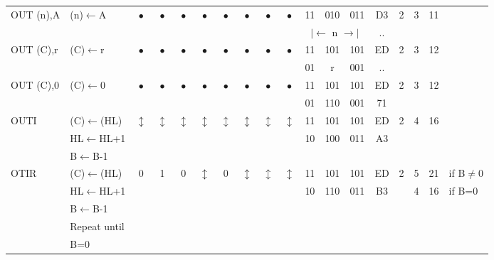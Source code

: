 \documentclass[oneside,a4paper]{book}
\newcommand{\instrt}{\rule{0pt}{2.7ex}}
\newcommand{\instrb}{\rule[-1.7ex]{0pt}{0pt}}
\begin{document}
{\begin{tabular}{llcccccccccccccccl}
		OUT (n),A\instrt & 
			(n)$\leftarrow$A &
			$\bullet$ & 
				$\bullet$ & 
				$\bullet$ & 
				$\bullet$ & 
				$\bullet$ & 
				$\bullet$ & 
				$\bullet$ & 
				$\bullet$ & 
			11 & 010 & 011 & 
			D3 & 2 & 
			3 & 11 & \\
			\multicolumn{10}{c}{} & \multicolumn{3}{c}{$|\longleftarrow$ n $\longrightarrow|$} & .. & \instrb \\

		OUT (C),r\instrt & 
			(C)$\leftarrow$r &
			$\bullet$ & 
				$\bullet$ & 
				$\bullet$ & 
				$\bullet$ & 
				$\bullet$ & 
				$\bullet$ & 
				$\bullet$ & 
				$\bullet$ & 
			11 & 101 & 101 & 
			ED & 2 & 
			3 & 12 & \\
			\multicolumn{10}{c}{} & 01 & r & 001 & .. & \instrb \\

		OUT (C),0\instrt & 
			(C)$\leftarrow$0 &
			$\bullet$ & 
				$\bullet$ & 
				$\bullet$ & 
				$\bullet$ & 
				$\bullet$ & 
				$\bullet$ & 
				$\bullet$ & 
				$\bullet$ & 
			11 & 101 & 101 & 
			ED & 2 & 
			3 & 12 & \\
			\multicolumn{10}{c}{} & 01 & 110 & 001 & 71 & \instrb \\

		OUTI\instrt & 
			(C)$\leftarrow$(HL) & 
			$\updownarrow$\footnotemark[1] & 
				$\updownarrow$\footnotemark[1] & 
				$\updownarrow$\footnotemark[1] & 
				$\updownarrow$\footnotemark[3] & 
				$\updownarrow$\footnotemark[1] & 
				$\updownarrow$\footnotemark[3] & 
				$\updownarrow$\footnotemark[2] & 
				$\updownarrow$\footnotemark[3] & 
			11 & 101 & 101 & 
			ED & 2 & 
			4 & 16 & \\
			& HL$\leftarrow$HL+1 & \multicolumn{8}{c}{} & 10 & 100 & 011 & A3 & \\
			& B$\leftarrow$B-1 & \instrb \\

		OTIR\instrt & 
			(C)$\leftarrow$(HL) & 
			0 & 
				1 & 
				0 & 
				$\updownarrow$\footnotemark[3] & 
				0 & 
				$\updownarrow$ & 
				$\updownarrow$\footnotemark[2] & 
				$\updownarrow$\footnotemark[3] & 
			11 & 101 & 101 & 
			ED & 2 & 
			5 & 21 & {if B$\not=$0} \\
			& HL$\leftarrow$HL+1 & \multicolumn{8}{c}{} & 10 & 110 & 011 & B3 & & 4 & 16 & {if B=0} \\
			& B$\leftarrow$B-1 \\
			& Repeat until \\
			& B=0 & \instrb \\


\end{tabular}}
\end{document}
